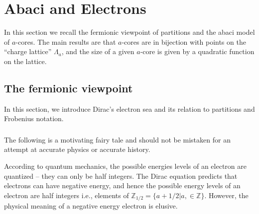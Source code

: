 \documentclass{amsart}[12pt]
\theoremstyle{definition}
\newtheorem{definition}[dummy]{Definition}
\newcommand{\Z}{\mathbb{Z}}
\newcommand{\R}{\mathbb{R}}
\begin{document}



\section{Abaci and Electrons} \label{sec:abacus}

In this section we recall the fermionic viewpoint of partitions and the abaci model of $a$-cores.  The main results are that $a$-cores are in bijection with points on the ``charge lattice'' $\Lambda_a$, and the size of a given $a$-core is given by a quadratic function on the lattice.



\subsection{The fermionic viewpoint}
In this section, we introduce Dirac's electron sea and its relation to partitions and Frobenius notation.

\subsubsection{} The following is a motivating fairy tale and should not be mistaken for an attempt at accurate physics or accurate history.


According to quantum mechanics, the possible energies levels of an electron are quantized -- they can only be half integers.  The Dirac equation predicts that electrons can have negative energy, and hence the possible energy levels of an electron are half integers i.e., elements of $\Z_{1/2}=\{a+1/2|a,\in\Z\}$.  However, the physical meaning of a negative energy electron is elusive.
\end{document}
